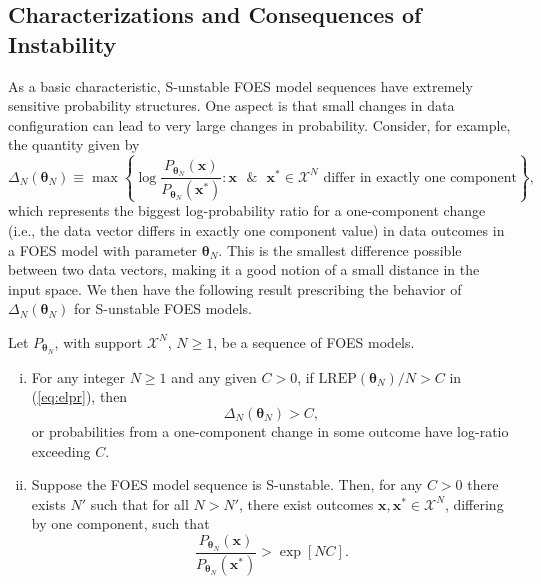 \documentclass[numbib]{imamat}
\theoremstyle{theorem}
\theoremstyle{lemma}
\theoremstyle{example}
\theoremstyle{corollary}
\theoremstyle{definition}
\theoremstyle{remark}
\theoremstyle{approximation}
\theoremstyle{scheme}
\newcommand{\REP}{\mathrm{LREP}}
\newcommand{\DN}{\Delta_N}
\newcommand{\ak}[1]{{\color{blue} #1}}
\let\BeginKnitrBlock\begin \let\EndKnitrBlock\end
\begin{document}
\hypertarget{characterizations-and-consequences-of-instability}{%
\subsection{Characterizations and Consequences of Instability}\label{characterizations-and-consequences-of-instability}}

As a basic characteristic, S-unstable FOES model sequences have extremely sensitive probability structures. One aspect is that small changes in data configuration can lead to very large changes in probability. Consider, for example, the quantity given by
\[
\DN(\boldsymbol \theta_N) \equiv \max \left\{\log \frac{P_{\boldsymbol \theta_N}(\boldsymbol x)}{P_{\boldsymbol \theta_N}(\boldsymbol x^*)} : \boldsymbol x \text{ }\& \text{ } \boldsymbol x^* \in \mathcal{X}^N \text{ differ in exactly one component}\right\},
\]
which represents the biggest log-probability ratio for a one-component change \ak{(i.e., the data vector differs in exactly one component value)} in data outcomes in a FOES model with parameter \(\boldsymbol \theta_N\). \ak{This is the smallest difference possible between two data vectors, making it a good notion of a small distance in the input space.} We then have the following result prescribing the behavior of \(\DN(\boldsymbol \theta_N)\) for S-unstable FOES models.

\BeginKnitrBlock{theorem}
\protect\hypertarget{thm:instab-elpr}{}{\label{thm:instab-elpr} }Let \(P_{\boldsymbol \theta_N}\), with support \(\mathcal{X}^N\), \(N\geq 1\), be a sequence of FOES models.
\begin{enumerate}[(i)]
\item For any integer $N \geq 1$ and any given $C>0$, if $\REP(\boldsymbol \theta_N)/N > C$ in (\ref{eq:elpr}), then
    $$ \DN(\boldsymbol \theta_N) > C,$$
    or probabilities from a one-component change in some outcome have log-ratio exceeding $C$.
\item Suppose the FOES model sequence is S-unstable. Then, \ak{for any $C>0$ there exists $N'$ such that for all $N>N'$}, there exist outcomes $\boldsymbol x,\boldsymbol x^*\in\mathcal{X}^N$, differing by one component, such that
    $$
    \frac{P_{\boldsymbol \theta_N}(\boldsymbol x)}{P_{\boldsymbol \theta_N}(\boldsymbol x^*)} > \exp[N C].
    $$
\end{enumerate}
\EndKnitrBlock{theorem}
\end{document}
